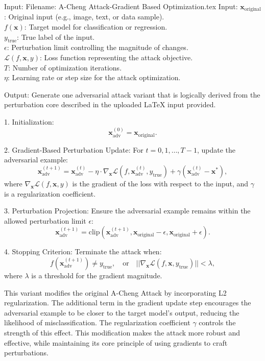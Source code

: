 Input: Filename: A-Cheng Attack-Gradient Based Optimization.tex
Input: $\mathbf{x}_{\text{original}}$: Original input (e.g., image, text, or data sample). \\
$f(\mathbf{x})$: Target model for classification or regression. \\
$y_{\text{true}}$: True label of the input. \\
$\epsilon$: Perturbation limit controlling the magnitude of changes. \\
$\mathcal{L}(f, \mathbf{x}, y)$: Loss function representing the attack objective. \\
$T$: Number of optimization iterations. \\
$\eta$: Learning rate or step size for the attack optimization.

Output: Generate one adversarial attack variant that is logically derived from the perturbation core described in the uploaded LaTeX input provided.

1. Initialization:
   \[
   \mathbf{x}_{\text{adv}}^{(0)} = \mathbf{x}_{\text{original}}.
   \]

2. Gradient-Based Perturbation Update:
   For $t = 0, 1, \ldots, T-1$, update the adversarial example:
   \[
   \mathbf{x}_{\text{adv}}^{(t+1)} = \mathbf{x}_{\text{adv}}^{(t)} - \eta \cdot \nabla_{\mathbf{x}} \mathcal{L}(f, \mathbf{x}_{\text{adv}}^{(t)}, y_{\text{true}}) + \gamma (\mathbf{x}_{\text{adv}}^{(t)} - \mathbf{x}^*),
   \]
   where $\nabla_{\mathbf{x}} \mathcal{L}(f, \mathbf{x}, y)$ is the gradient of the loss with respect to the input, and $\gamma$ is a regularization coefficient.

3. Perturbation Projection:
   Ensure the adversarial example remains within the allowed perturbation limit $\epsilon$:
   \[
   \mathbf{x}_{\text{adv}}^{(t+1)} = \text{clip}(\mathbf{x}_{\text{adv}}^{(t+1)}, \mathbf{x}_{\text{original}} - \epsilon, \mathbf{x}_{\text{original}} + \epsilon).
   \]

4. Stopping Criterion:
   Terminate the attack when:
   \[
   f(\mathbf{x}_{\text{adv}}^{(t+1)}) \neq y_{\text{true}}, \quad \text{or} \quad ||\nabla_{\mathbf{x}} \mathcal{L}(f, \mathbf{x}, y_{\text{true}})|| < \lambda,
   \]
   where $\lambda$ is a threshold for the gradient magnitude.

This variant modifies the original A-Cheng Attack by incorporating L2 regularization. The additional term in the gradient update step encourages the adversarial example to be closer to the target model's output, reducing the likelihood of misclassification. The regularization coefficient $\gamma$ controls the strength of this effect. This modification makes the attack more robust and effective, while maintaining its core principle of using gradients to craft perturbations.